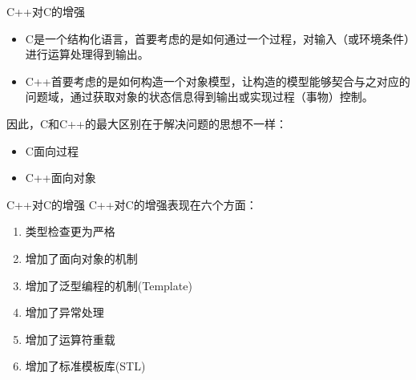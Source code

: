 \begin{frame}{C++对C的增强}

  \begin{itemize}
  \item C是一个结构化语言，首要考虑的是如何通过一个过程，对输入（或环境条件）进行运算处理得到输出。
  \item C++首要考虑的是如何构造一个对象模型，让构造的模型能够契合与之对应的问题域，通过获取对象的状态信息得到输出或实现过程（事物）控制。
  \end{itemize}

  因此，C和C++的最大区别在于解决问题的思想不一样：
  \begin{itemize}
  \item C面向过程
  \item C++面向对象
  \end{itemize}

\end{frame}


\begin{frame}{C++对C的增强}
  C++对C的增强表现在六个方面：

  \begin{enumerate}
  \item 类型检查更为严格
  \item 增加了面向对象的机制
  \item 增加了泛型编程的机制(Template)
  \item 增加了异常处理
  \item 增加了运算符重载
  \item 增加了标准模板库(STL)
  \end{enumerate}
\end{frame}
